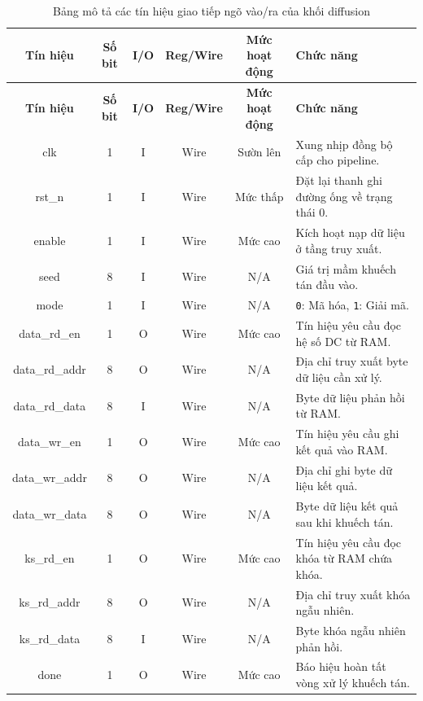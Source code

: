\begin{longtable}{|c|c|c|c|c|p{4.5cm}|}
	\caption{Bảng mô tả các tín hiệu giao tiếp ngõ vào/ra của khối diffusion}
	\label{bang_diffusion} \\
	\hline
	\textbf{Tín hiệu} & \textbf{Số bit} & \textbf{I/O} & \textbf{Reg/Wire} & \textbf{Mức hoạt động} & \textbf{Chức năng} \\ \hline
	\endfirsthead
	
	\hline
	\textbf{Tín hiệu} & \textbf{Số bit} & \textbf{I/O} & \textbf{Reg/Wire} & \textbf{Mức hoạt động} & \textbf{Chức năng} \\ \hline
	\endhead
	
	clk             & 1 & I & Wire & Sườn lên & Xung nhịp đồng bộ cấp cho pipeline. \\ \hline
	rst\_n          & 1 & I & Wire & Mức thấp & Đặt lại thanh ghi đường ống về trạng thái 0. \\ \hline
	enable          & 1 & I & Wire & Mức cao  & Kích hoạt nạp dữ liệu ở tầng truy xuất. \\ \hline
	seed            & 8 & I & Wire & N/A      & Giá trị mầm khuếch tán đầu vào. \\ \hline
	mode            & 1 & I & Wire & N/A      & \texttt{0}: Mã hóa, \texttt{1}: Giải mã. \\ \hline
	data\_rd\_en    & 1 & O & Wire & Mức cao  & Tín hiệu yêu cầu đọc hệ số DC từ RAM. \\ \hline
	data\_rd\_addr  & 8 & O & Wire & N/A      & Địa chỉ truy xuất byte dữ liệu cần xử lý. \\ \hline
	data\_rd\_data  & 8 & I & Wire & N/A      & Byte dữ liệu phản hồi từ RAM. \\ \hline
	data\_wr\_en    & 1 & O & Wire & Mức cao  & Tín hiệu yêu cầu ghi kết quả vào RAM. \\ \hline
	data\_wr\_addr  & 8 & O & Wire & N/A      & Địa chỉ ghi byte dữ liệu kết quả. \\ \hline
	data\_wr\_data  & 8 & O & Wire & N/A      & Byte dữ liệu kết quả sau khi khuếch tán. \\ \hline
	ks\_rd\_en      & 1 & O & Wire & Mức cao  & Tín hiệu yêu cầu đọc khóa từ RAM chứa khóa. \\ \hline
	ks\_rd\_addr    & 8 & O & Wire & N/A      & Địa chỉ truy xuất khóa ngẫu nhiên. \\ \hline
	ks\_rd\_data    & 8 & I & Wire & N/A      & Byte khóa ngẫu nhiên phản hồi. \\ \hline
	done            & 1 & O & Wire & Mức cao  & Báo hiệu hoàn tất vòng xử lý khuếch tán. \\ \hline
\end{longtable}

